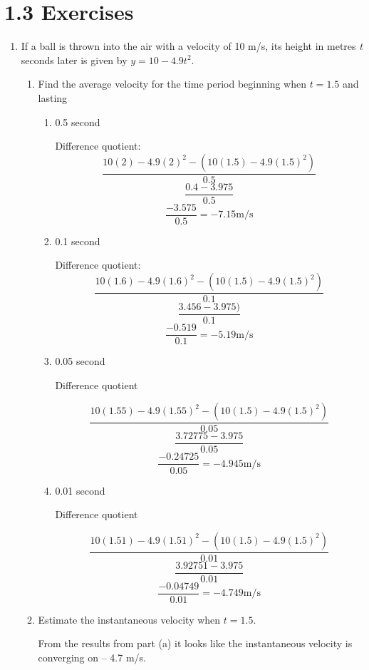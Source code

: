 \documentclass{article}
\begin{document}
	\section{1.3 Exercises}
	
	\begin{enumerate}
		\item If a ball is thrown into the air with a velocity of 10 m/s, its height in metres
			\emph{t} seconds later is given by $y = 10 - 4.9t^2$.
			
			\begin{enumerate}
				\item Find the average velocity for the time period beginning when $t = 1.5$ and
					lasting
				\begin{enumerate}
					\item 0.5 second
					
					Difference quotient:
					$$\frac{10(2) - 4.9(2)^2 - (10(1.5) - 4.9(1.5)^2)}{0.5}$$
					$$\frac{0.4 - 3.975}{0.5}$$
					$$\frac{-3.575}{0.5} = -7.15 \text{m/s}$$
					
					\item 0.1 second
					
					Difference quotient:
					$$\frac{10(1.6) - 4.9(1.6)^2 - (10(1.5) - 4.9(1.5)^2)}{0.1}$$
					$$\frac{3.456 - 3.975)}{0.1}$$
					$$\frac{-0.519}{0.1} = -5.19 \text{m/s}$$
					
					\item 0.05 second
					
					Difference quotient
					
					$$\frac{10(1.55) - 4.9(1.55)^2 -  (10(1.5) - 4.9(1.5)^2)}{0.05}$$
					$$\frac{ 3.72775 - 3.975}{0.05}$$
					$$\frac{ -0.24725}{0.05} = - 4.945 \text{m/s}$$
					
					\item 0.01 second
					
					Difference quotient
					
					$$\frac{10(1.51) - 4.9(1.51)^2 -  (10(1.5) - 4.9(1.5)^2)}{0.01}$$
					$$\frac{ 3.92751 - 3.975 }{0.01}$$
					$$\frac{ -0.04749}{0.01} = - 4.749\text{m/s}$$					
					
				\end{enumerate}
				\item Estimate the instantaneous velocity when $t = 1.5$.
				
					From the results from part (a) it looks like the instantaneous velocity is converging on -- 4.7 m/s.
				
				
			\end{enumerate}
	\end{enumerate}
\end{document}
